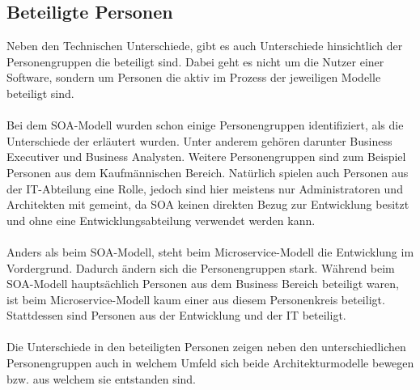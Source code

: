 \subsection{Beteiligte Personen}
\label{subsec:FazitBeteiligtePersonen}
Neben den Technischen Unterschiede, gibt es auch Unterschiede hinsichtlich der Personengruppen die beteiligt sind. Dabei geht es nicht um die Nutzer einer Software, sondern um Personen die aktiv im Prozess der jeweiligen Modelle beteiligt sind.
\\\\
Bei dem SOA-Modell wurden schon einige Personengruppen identifiziert, als die Unterschiede der  erläutert wurden. Unter anderem gehören darunter Business Executiver und Business Analysten. Weitere Personengruppen sind zum Beispiel Personen aus dem Kaufmännischen Bereich. Natürlich spielen auch Personen aus der IT-Abteilung eine Rolle, jedoch sind hier meistens nur Administratoren und Architekten mit gemeint, da SOA keinen direkten Bezug zur Entwicklung besitzt und ohne eine Entwicklungsabteilung verwendet werden kann.
\\\\
Anders als beim SOA-Modell, steht beim Microservice-Modell die Entwicklung im Vordergrund. Dadurch ändern sich die Personengruppen stark. Während beim SOA-Modell hauptsächlich Personen aus dem Business Bereich beteiligt waren, ist beim Microservice-Modell kaum einer aus diesem Personenkreis beteiligt. Stattdessen sind Personen aus der Entwicklung und der IT beteiligt.
\\\\
Die Unterschiede in den beteiligten Personen zeigen neben den unterschiedlichen Personengruppen auch in welchem Umfeld sich beide Architekturmodelle bewegen bzw. aus welchem sie entstanden sind.